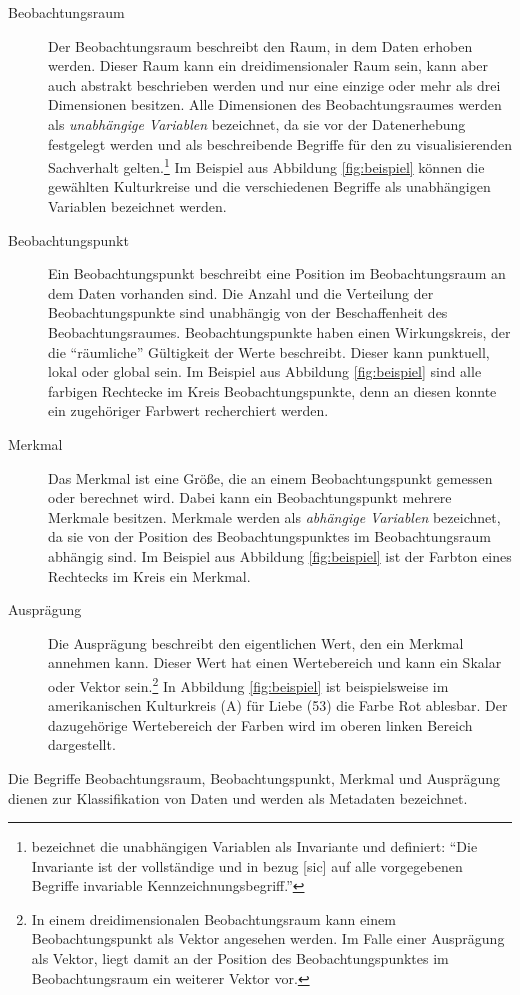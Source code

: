 \documentclass[a4paper, 
               12pt,
               DIV=calc,
               version=first,
               pdftex,
               headsepline,
               footsepline,
               bibtotocnumbered,
               liststotocnumbered]{scrreprt}
\begin{document}
\begin{description}
\item[Beobachtungsraum]
Der Beobachtungsraum beschreibt den Raum, in dem Daten erhoben werden. Dieser Raum kann ein
dreidimensionaler Raum sein, kann aber auch abstrakt beschrieben werden und nur eine einzige oder
mehr als drei Dimensionen besitzen. Alle Dimensionen des Beobachtungsraumes werden als \textit{unabhängige
Variablen} bezeichnet, da sie vor der Datenerhebung festgelegt werden und als beschreibende Begriffe für
den zu visualisierenden Sachverhalt gelten.\footnote{\citep[S.\,24]{Bertin} bezeichnet die unabhängigen
Variablen als Invariante und definiert: "`Die Invariante ist der vollständige und in bezug [sic] auf alle vorgegebenen
Begriffe invariable Kennzeichnungsbegriff."'} Im Beispiel aus Abbildung \ref{fig:beispiel} können die
gewählten Kulturkreise und die verschiedenen Begriffe als unabhängigen Variablen bezeichnet werden.
\item[Beobachtungspunkt]
Ein Beobachtungspunkt beschreibt eine Position im Beobachtungsraum an dem Daten vorhanden sind. Die Anzahl und die Verteilung
der Beobachtungspunkte sind unabhängig von der Beschaffenheit des Beobachtungsraumes. Beobachtungspunkte haben einen
Wirkungskreis, der die "`räumliche"' Gültigkeit der Werte beschreibt. Dieser kann punktuell, lokal oder global sein.
Im Beispiel aus Abbildung \ref{fig:beispiel} sind alle farbigen Rechtecke im Kreis Beobachtungspunkte, denn an
diesen konnte ein zugehöriger Farbwert recherchiert werden.
\item[Merkmal]
Das Merkmal ist eine Größe, die an einem Beobachtungspunkt gemessen oder berechnet wird. Dabei kann
ein Beobachtungspunkt mehrere Merkmale besitzen. Merkmale werden als \textit{abhängige Variablen} bezeichnet, da
sie von der Position des Beobachtungspunktes im Beobachtungsraum abhängig sind.
Im Beispiel aus Abbildung \ref{fig:beispiel} ist der Farbton eines Rechtecks im Kreis ein Merkmal.
\item[Ausprägung]
Die Ausprägung beschreibt den eigentlichen Wert, den ein Merkmal annehmen kann. Dieser Wert hat einen
Wertebereich und kann ein Skalar oder Vektor sein.\footnote{In einem dreidimensionalen Beobachtungsraum
kann einem Beobachtungspunkt als Vektor angesehen werden. Im Falle einer Ausprägung als Vektor, liegt damit
an der Position des Beobachtungspunktes im Beobachtungsraum ein weiterer Vektor vor.}
In Abbildung \ref{fig:beispiel} ist beispielsweise im amerikanischen Kulturkreis (A) für Liebe (53) die Farbe
Rot ablesbar. Der dazugehörige Wertebereich der Farben wird im oberen linken Bereich dargestellt.
\end{description}
Die Begriffe Beobachtungsraum, Beobachtungspunkt, Merkmal und Ausprägung dienen zur Klassifikation von Daten
und werden als Metadaten bezeichnet.
\end{document}
